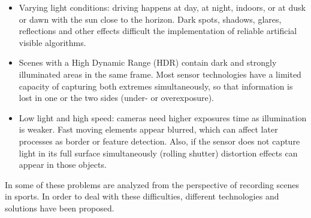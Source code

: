 \begin{itemize}
    \item Varying light conditions: driving happens at day, at night, indoors, 
    or at dusk or dawn with the sun close to the horizon. 
    Dark spots, shadows, glares, reflections and other effects difficult the
    implementation of reliable artificial visible algorithms.
    
    \item Scenes with a High Dynamic Range (HDR) contain dark and strongly
    illuminated areas in the same frame.
    Most sensor technologies have a limited capacity of capturing both extremes
    simultaneously, so that information is lost in one or the two sides (under- 
    or overexposure). 
        
    \item Low light and high speed: cameras need higher exposures time as
    illumination is weaker. Fast moving elements appear blurred, which can 
    affect later processes as border or feature detection. Also, if the sensor
    does not capture light in its full surface simultaneously (rolling shutter)
    distortion effects can appear in those objects.
\end{itemize}

In \cite{Pueo2016} some of these problems are analyzed from the perspective of
recording scenes in sports.
In order to deal with these difficulties, different technologies and solutions 
have been proposed. 

